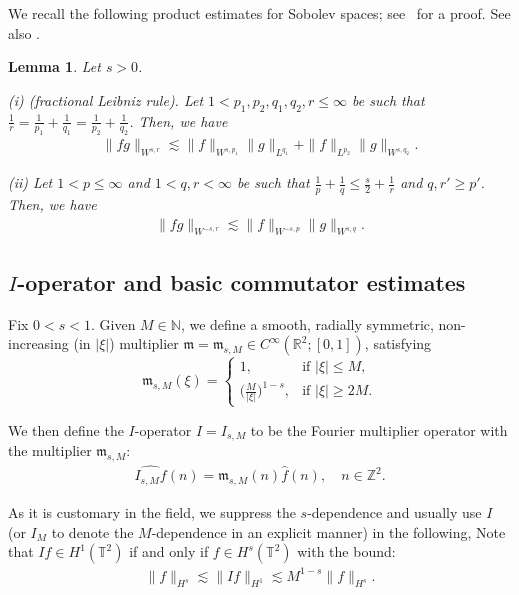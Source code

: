 \documentclass[letterpaper, 11pt,  reqno]{amsart}
\newtheorem{lemma}[theorem]{Lemma}
\newcommand{\1}{\hspace{0.5mm}\text{I}\hspace{0.2mm}}
\newcommand{\noi}{\noindent}
\newcommand{\R}{\mathbb{R}}
\newcommand{\T}{\mathbb{T}}
\newcommand{\Z}{\mathbb{Z}}
\newcommand{\N}{\mathbb{N}}
\newcommand{\ft}{\widehat}
\newcommand{\les}{\lesssim}
\newcommand{\mf}{\mathfrak{m}}
\numberwithin{equation}{section}
\numberwithin{theorem}{section}
\begin{document}
We recall the following product estimates for Sobolev spaces;
see~\cite{BOZ} for a proof. See also \cite{GKO}.

\begin{lemma}
\label{LEM:prod}
Let $s > 0$.

\smallskip \noi
\textup{(i) (fractional Leibniz rule).} Let $1 < p_1, p_2, q_1, q_2, r \leq \infty$ be such that $\frac{1}{r} = \frac{1}{p_1} + \frac{1}{q_1} = \frac{1}{p_2} + \frac{1}{q_2}$. Then, we have
\begin{align*}
    \| f g \|_{W^{s, r}} \les \| f \|_{W^{s, p_1}} \| g \|_{L^{q_1}} + \| f \|_{L^{p_2}} \| g \|_{W^{s, q_2}}.
\end{align*}

\smallskip \noi
\textup{(ii)} Let $1 < p \leq \infty$ and $1 < q, r < \infty$ be such that 
$ \frac{1}{p} + \frac{1}{q}\le \frac s2 +  \frac{1}{r}$ and $q, r' \geq p'$. Then, we have
\begin{align*}
    \| f g \|_{W^{-s, r}} \les \| f \|_{W^{-s, p}} \| g \|_{W^{s, q}}.
\end{align*}
\end{lemma}



\subsection{$I$-operator and basic commutator estimates} 
\label{SUBSEC:2.3}

Fix $0 < s < 1$.
Given $M \in \N$, we define a 
smooth, radially symmetric, non-increasing (in $|\xi|$)
multiplier $\mf = \mf_{s, M} \in C^\infty(\R^2; [0, 1])$, satisfying %
\begin{equation*}
\mf_{s, M}(\xi)=
\begin{cases}
1, & \text{if } |\xi|\le M, \\
\big(\frac{M}{|\xi|}\big)^{1-s}, & \text{if } |\xi|\ge2M.
\end{cases}
\end{equation*} 

\noi
We then define the $I$-operator $I = I_{s, M}$
to be the Fourier multiplier operator with the multiplier $\mf_{s, M}$:
\begin{align}
\ft{I_{s, M}f}(n)=\mf_{s, M}(n)\ft{f}(n), \quad n \in \Z^2.
\label{I2}
\end{align}


\noi
As it is customary in the field, 
we  suppress the $s$-dependence
and 
 usually use $I$ (or $I_M$ to denote 
the $M$-dependence in an explicit manner)  in the following, 
Note that 
 $I f \in H^1(\T^2)$ if and only if $f \in H^s(\T^2)$
with the bound:
\begin{align}
\|f\|_{H^s}\les \|I f\|_{ H^1} \les M^{1-s} \|f\|_{H^s}.
\label{I3}
\end{align}
\end{document}
